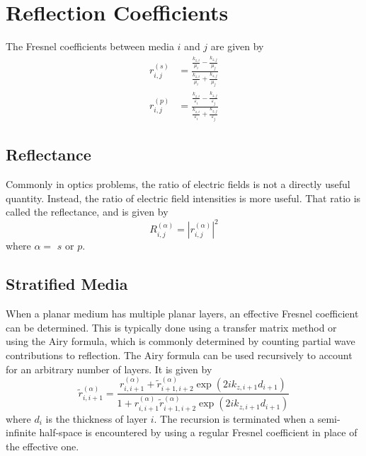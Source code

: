 \section{Reflection Coefficients} 
%
The Fresnel coefficients between media $i$ and $j$ are given by
%
\begin{subequations}
\begin{align}
r_{i,j}^{(s)} &= \frac{ \frac{k_{z,i}}{\mu_{i}} - \frac{k_{z,j}}{\mu_{j}} }{ \frac{k_{z,i}}{\mu_{i}} + \frac{k_{z,j}}{\mu_{j}} } \\
r_{i,j}^{(p)} &= \frac{ \frac{k_{z,i}}{\varepsilon_{i}} - \frac{k_{z,j}}{\varepsilon_{j}} }{ \frac{k_{z,i}}{\varepsilon_{i}} + \frac{k_{z,j}}{\varepsilon_{j}} }
\end{align}
\end{subequations}

\subsection{Reflectance}
%
Commonly in optics problems, the ratio of electric fields is not a directly useful quantity. Instead, the ratio of electric field intensities is more useful. That ratio is called the reflectance, and is given by
%
\begin{equation}
R_{i,j}^{(\alpha)} = \left| r_{i,j}^{(\alpha)} \right|^{2}
\end{equation}
%
where $\alpha =$ $s$ or $p$.

\subsection{Stratified Media}
%
When a planar medium has multiple planar layers, an effective Fresnel coefficient can be determined. This is typically done using a transfer matrix method\cite{Katsidis2002, Troparevsky2010} or using the Airy formula,\cite{Airy1833, Kaushik1997, Jen2001, Narayanaswamy2013b} which is commonly determined by counting partial wave contributions to reflection. The Airy formula can be used recursively to account for an arbitrary number of layers. It is given by
%
\begin{equation}
\widetilde{r}_{i,i+1}^{(\alpha)} = \frac{r_{i,i+1}^{(\alpha)} + \widetilde{r}_{i+1,i+2}^{(\alpha)} \exp{\left( 2i k_{z,i+1} d_{i+1} \right)} }{ 1 + r_{i,i+1}^{(\alpha)} \widetilde{r}_{i+1,i+2}^{(\alpha)} \exp{\left( 2i k_{z,i+1} d_{i+1} \right)} } 
\end{equation}
%
where $d_{i}$ is the thickness of layer $i$. The recursion is terminated when a semi-infinite half-space is encountered by using a regular Fresnel coefficient in place of the effective one. 